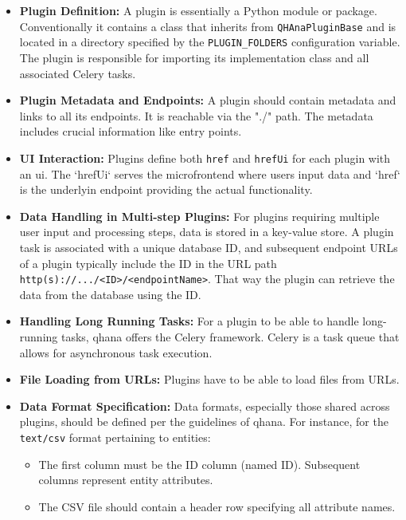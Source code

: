 \documentclass[
  a4paper,  %
  twoside,  %
  bibliography=totoc,
  headsepline,
  cleardoublepage=empty,
  parskip=half,
  draft=false
]{scrbook}
\begin{document}
\begin{itemize}
    \item \textbf{Plugin Definition:}
    A plugin is essentially a Python module or package.
    Conventionally it contains a class that inherits from \texttt{QHAnaPluginBase} and is located in a directory specified by the \texttt{PLUGIN\_FOLDERS} configuration variable.
    The plugin is responsible for importing its implementation class and all associated Celery tasks.

    \item \textbf{Plugin Metadata and Endpoints:}
    A plugin should contain metadata and links to all its endpoints. It is reachable via the "./" path.
    The metadata includes crucial information like entry points.

    \item \textbf{UI Interaction:}
    Plugins define both \texttt{href} and \texttt{hrefUi} for each plugin with an \gls{ui}.
    The `hrefUi` serves the microfrontend where users input data and `href` is the underlyin endpoint providing the actual functionality.

    \item \textbf{Data Handling in Multi-step Plugins:}
    For plugins requiring multiple user input and processing steps, data is stored in a key-value store.
    A plugin task is associated with a unique database ID, and subsequent endpoint URLs of a plugin typically include the ID in the URL path \texttt{http(s)://.../<ID>/<endpointName>}.
    That way the plugin can retrieve the data from the database using the ID.

    \item \textbf{Handling Long Running Tasks:}
    For a plugin to be able to handle long-running tasks, \gls{qhana} offers the Celery framework.
    Celery is a task queue that allows for asynchronous task execution.

    \item \textbf{File Loading from URLs:}
    Plugins have to be able to load files from URLs.

    \item \textbf{Data Format Specification:}
    Data formats, especially those shared across plugins, should be defined per the guidelines of \gls{qhana}.
    For instance, for the \texttt{text/csv} format pertaining to entities:
    \begin{itemize}
        \item The first column must be the ID column (named ID). Subsequent columns represent entity attributes.
        \item The CSV file should contain a header row specifying all attribute names.
    \end{itemize}
\end{itemize}
\end{document}
